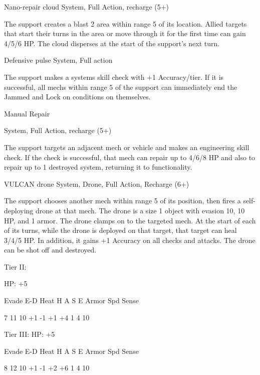 Nano-repair cloud
System, Full Action, recharge (5+)

The support creates a blast 2 area within range 5 of its location. Allied targets that start their
turns in the area or move through it for the first time can gain 4/5/6 HP. The cloud disperses at
the start of the support's next turn.


Defensive pulse
System, Full action

The support makes a systems skill check with +1 Accuracy/tier. If it is successful, all mechs
within range 5 of the support can immediately end the Jammed and Lock on conditions on
themselves.


Manual Repair

System, Full Action, recharge (5+)

The support targets an adjacent mech or vehicle and makes an engineering skill check. If the
check is successful, that mech can repair up to 4/6/8 HP and also to repair up to 1 destroyed
system, returning it to functionality.


VULCAN drone
System, Drone, Full Action, Recharge (6+)

The support chooses another mech within range 5 of its position, then fires a self-deploying
drone at that mech. The drone is a size 1 object with evasion 10, 10 HP, and 1 armor. The drone
clamps on to the targeted mech. At the start of each of its turns, while the drone is deployed on
that target, that target can heal 3/4/5 HP. In addition, it gains +1 Accuracy on all checks and
attacks. The drone can be shot off and destroyed.


Tier II:

HP: +5


          Evade    E-D    Heat     H    A     S     E       Armor        Spd      Sense

          7        11     10       +1   -1    +1    +4      1            4        10

Tier III:
HP: +5


          Evade    E-D    Heat     H    A     S     E       Armor        Spd      Sense

          8        12     10       +1   -1    +2    +6      1            4        10

